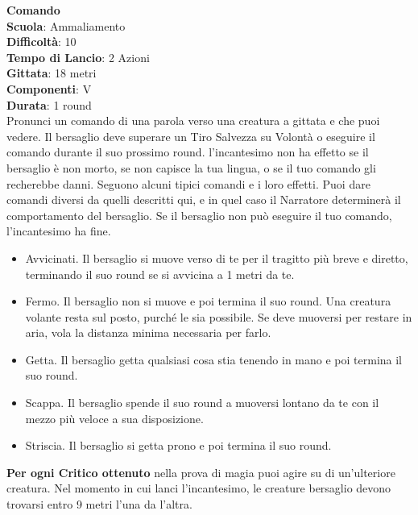 \begin{multicols}{2}
\medskip\textbf{Comando}\\
\textbf{Scuola}: Ammaliamento\\
\textbf{Difficoltà}:  10\\
\textbf{Tempo di Lancio}: 2 Azioni\\
\textbf{Gittata}: 18 metri\\
\textbf{Componenti}: V\\
\textbf{Durata}: 1 round\\
Pronunci un comando di una parola verso una creatura a gittata e che puoi vedere. Il bersaglio deve superare un Tiro Salvezza su Volontà o eseguire il comando durante il suo prossimo round. l'incantesimo non ha effetto se il bersaglio è non morto, se non capisce la tua lingua, o se il tuo comando gli recherebbe danni. Seguono alcuni tipici comandi e i loro effetti. Puoi dare comandi diversi da quelli descritti qui, e in quel caso il Narratore determinerà il comportamento del bersaglio. Se il bersaglio non può eseguire il tuo comando, l'incantesimo ha fine.
\begin{itemize}
	\item 
Avvicinati. Il bersaglio si muove verso di te per il tragitto più breve e diretto, terminando il suo round se si avvicina a 1 metri da te.
	\item 
Fermo. Il bersaglio non si muove e poi termina il suo round. Una creatura volante resta sul posto, purché le sia possibile. Se deve muoversi per restare in aria, vola la distanza minima necessaria per farlo.
	\item 
	Getta. Il bersaglio getta qualsiasi cosa stia tenendo in mano e poi termina il suo round. 	\item 
	Scappa. Il bersaglio spende il suo round a muoversi lontano da te con il mezzo più veloce a sua disposizione.
	\item  Striscia. Il bersaglio si getta prono e poi termina il suo round.
\end{itemize}

\textbf{Per ogni Critico ottenuto} nella prova di magia puoi agire su di un'ulteriore creatura. Nel momento in cui lanci l'incantesimo, le creature bersaglio devono trovarsi entro 9 metri l’una da l’altra.


\end{multicols}
